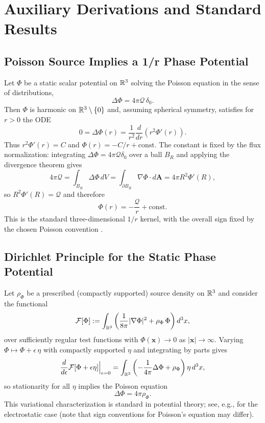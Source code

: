 \section{Auxiliary Derivations and Standard Results}

\subsection{Poisson Source Implies a 1/r Phase Potential}
\label{app:phase_poisson}
Let $\Phi$ be a static scalar potential on $\mathbb{R}^3$ solving the Poisson equation in the sense of distributions,
\begin{equation}
  \Delta \Phi = 4\pi \mathcal{Q}\,\delta_0 .
\end{equation}
Then $\Phi$ is harmonic on $\mathbb{R}^3\setminus\{0\}$ and, assuming spherical symmetry, satisfies for $r>0$ the ODE
\begin{equation}
  0=\Delta \Phi(r)=\frac{1}{r^2}\frac{d}{dr}\left(r^2\Phi'(r)\right).
\end{equation}
Thus $r^2\Phi'(r)=C$ and $\Phi(r)= -C/r + \mathrm{const}$. The constant is fixed by the flux normalization:
integrating $\Delta\Phi=4\pi\mathcal{Q}\delta_0$ over a ball $B_R$ and applying the divergence theorem gives
\begin{equation}
  4\pi\mathcal{Q}=\int_{B_R}\Delta\Phi\,dV=\int_{\partial B_R}\nabla\Phi\cdot d\mathbf{A}=4\pi R^2\Phi'(R),
\end{equation}
so $R^2\Phi'(R)=\mathcal{Q}$ and therefore
\begin{equation}
  \Phi(r)=-\frac{\mathcal{Q}}{r}+\mathrm{const}.
\end{equation}
This is the standard three-dimensional $1/r$ kernel, with the overall sign fixed by the chosen Poisson convention \cite{Jackson1998}.

\subsection{Dirichlet Principle for the Static Phase Potential}
\label{app:dirichlet_poisson}
Let $\rho_\Phi$ be a prescribed (compactly supported) source density on $\mathbb{R}^3$ and consider the functional
\begin{equation}
  \mathcal{F}[\Phi]
  :=\int_{\mathbb{R}^3}\left(\frac{1}{8\pi}|\nabla \Phi|^2+\rho_\Phi\,\Phi\right)d^3x,
\end{equation}
over sufficiently regular test functions with $\Phi(\mathbf{x})\to 0$ as $|\mathbf{x}|\to\infty$.
Varying $\Phi\mapsto \Phi+\epsilon\,\eta$ with compactly supported $\eta$ and integrating by parts gives
\begin{equation}
  \frac{d}{d\epsilon}\mathcal{F}[\Phi+\epsilon\eta]\Big|_{\epsilon=0}
  =\int_{\mathbb{R}^3}\left(-\frac{1}{4\pi}\Delta\Phi+\rho_\Phi\right)\eta\,d^3x,
\end{equation}
so stationarity for all $\eta$ implies the Poisson equation
\begin{equation}
  \Delta\Phi=4\pi\rho_\Phi.
\end{equation}
This variational characterization is standard in potential theory; see, e.g., \cite{Jackson1998} for the electrostatic case (note that sign conventions for Poisson's equation may differ).

